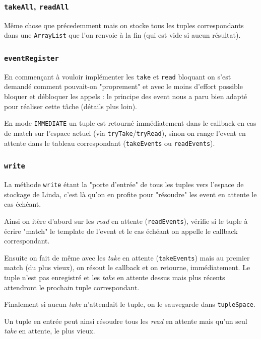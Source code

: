 \documentclass[headings=standardclasses,parskip=half]{scrartcl}
\begin{document}
\subsubsection{\texttt{takeAll}, \texttt{readAll}}

Même chose que précedemment mais on stocke tous les tuples correspondants
dans une \texttt{ArrayList} que l'on renvoie à la fin (qui est vide
si aucun résultat).

\subsubsection{\texttt{eventRegister}}

En commençant à vouloir implémenter les \texttt{take} et \texttt{read}
bloquant on s'est demandé comment pouvait-on "proprement" et avec le
moins d'effort possible bloquer et débloquer les appels : le principe
des event nous a paru bien adapté pour réaliser cette tâche
(détails plus loin).

En mode \texttt{IMMEDIATE} un tuple est retourné immédiatement dans
le callback en cas de match sur l'espace actuel
(via \texttt{tryTake}/\texttt{tryRead}),
sinon on range l'event en attente dans le tableau correspondant
(\texttt{takeEvents} ou \texttt{readEvents}).

\subsubsection{\texttt{write}}

La méthode \texttt{write} étant la "porte d'entrée" de tous les tuples
vers l'espace de stockage de Linda, c'est là qu'on en profite pour
"résoudre" les event en attente le cas échéant.

Ainsi on itère d'abord sur les \emph{read} en attente (\texttt{readEvents}),
vérifie si le tuple à écrire "match" le template de l'event et le cas
échéant on appelle le callback correspondant.

Ensuite on fait de même avec les \emph{take} en attente (\texttt{takeEvents})
mais au premier match (du plus vieux), on résout le callback et on retourne,
immédiatement. Le tuple n'est pas enregistré et les \emph{take} en attente
dessus mais plus récents attendront le prochain tuple correspondant.

Finalement si aucun \emph{take} n'attendait le tuple, on le sauvegarde dans
\texttt{tupleSpace}.

Un tuple en entrée peut ainsi résoudre tous les \emph{read} en attente mais
qu'un seul \emph{take} en attente, le plus vieux.
\end{document}
